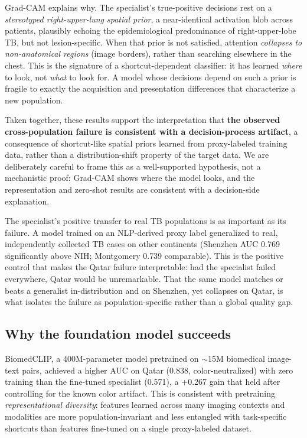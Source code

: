\documentclass[runningheads]{llncs}
\begin{document}
Grad-CAM explains why. The specialist's true-positive decisions rest on a \emph{stereotyped right-upper-lung spatial prior}, a near-identical activation blob across patients, plausibly echoing the epidemiological predominance of right-upper-lobe TB, but not lesion-specific. When that prior is not satisfied, attention \emph{collapses to non-anatomical regions} (image borders), rather than searching elsewhere in the chest. This is the signature of a shortcut-dependent classifier: it has learned \emph{where} to look, not \emph{what} to look for. A model whose decisions depend on such a prior is fragile to exactly the acquisition and presentation differences that characterize a new population.

Taken together, these results support the interpretation that \textbf{the observed cross-population failure is consistent with a decision-process artifact}, a consequence of shortcut-like spatial priors learned from proxy-labeled training data, rather than a distribution-shift property of the target data. We are deliberately careful to frame this as a well-supported hypothesis, not a mechanistic proof: Grad-CAM shows where the model looks, and the representation and zero-shot results are consistent with a decision-side explanation.

The specialist's positive transfer to real TB populations is as important as its failure. A model trained on an NLP-derived proxy label generalized to real, independently collected TB cases on other continents (Shenzhen AUC 0.769 significantly above NIH; Montgomery 0.739 comparable). This is the positive control that makes the Qatar failure interpretable: had the specialist failed everywhere, Qatar would be unremarkable. That the same model matches or beats a generalist in-distribution and on Shenzhen, yet collapses on Qatar, is what isolates the failure as population-specific rather than a global quality gap.

\subsection{Why the foundation model succeeds}
BiomedCLIP, a 400M-parameter model pretrained on $\sim$15M biomedical image-text pairs, achieved a higher AUC on Qatar (0.838, color-neutralized) with zero training than the fine-tuned specialist (0.571), a +0.267 gain that held after controlling for the known color artifact. This is consistent with pretraining \emph{representational diversity}: features learned across many imaging contexts and modalities are more population-invariant and less entangled with task-specific shortcuts than features fine-tuned on a single proxy-labeled dataset.
\end{document}
